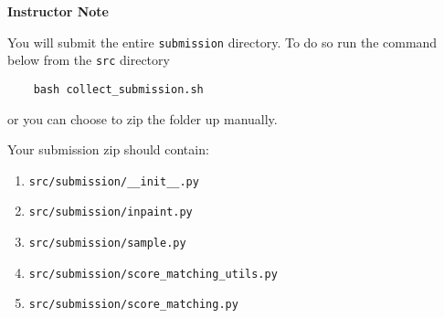 \textbf{Instructor Note}

You will submit the entire \texttt{submission} directory. To do so run the command  below from the \texttt{src} directory
\begin{verbatim}
    bash collect_submission.sh
\end{verbatim}

or you can choose to zip the folder up manually.

Your submission zip should contain:
\begin{enumerate}
    \item \texttt{src/submission/\_\_init\_\_.py}
    \item \texttt{src/submission/inpaint.py}
    \item \texttt{src/submission/sample.py}
    \item \texttt{src/submission/score\_matching\_utils.py}
    \item \texttt{src/submission/score\_matching.py}
\end{enumerate}